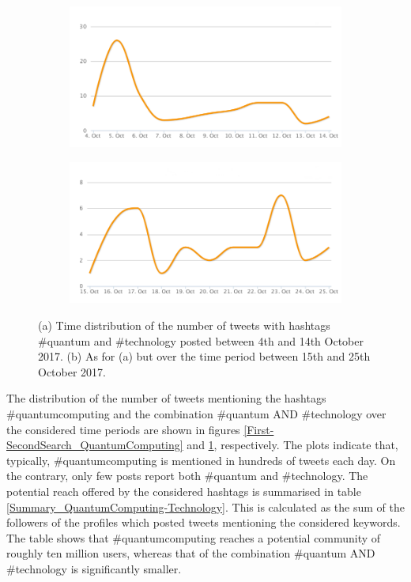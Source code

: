 \begin{figure}
 \centering
 \begin{subfigure}[b]{0.9\textwidth}
   \includegraphics[width=1\linewidth]{Images/FirstSearch_QuantumTechnology.png}
   \caption{} 
 \end{subfigure}

 \begin{subfigure}[b]{0.9\textwidth}
   \includegraphics[width=1\linewidth]{Images/SecondSearch_QuantumTechnology.png}
   \caption{}
 \end{subfigure}
 \caption{(a) Time distribution of the number of tweets with hashtags \#quantum and \#technology posted between 4th and 14th October 2017. (b) As for (a) but over the time period between 15th and 25th October 2017.} 
 \label{First-SecondSearch_QuantumTechnology}
\end{figure}

The distribution of the number of tweets mentioning the hashtags \#quantumcomputing and the combination \#quantum AND \#technology over the considered time periods are shown in figures \ref{First-SecondSearch_QuantumComputing} and \ref{First-SecondSearch_QuantumTechnology}, respectively. The plots indicate that, typically, \#quantumcomputing is mentioned in hundreds of tweets each day. On the contrary, only few posts report both \#quantum and \#technology. The potential reach offered by the considered hashtags is summarised in table \ref{Summary_QuantumComputing-Technology}. This is calculated as the sum of the followers of the profiles which posted tweets mentioning the considered keywords. The table shows that \#quantumcomputing reaches a potential community of roughly ten million users, whereas that of the combination \#quantum AND \#technology is significantly smaller.

